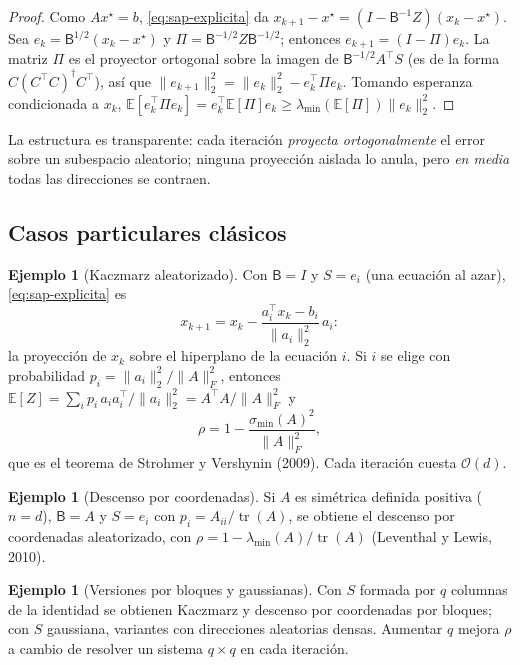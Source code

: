 \documentclass[11pt,a4paper,oneside]{book}
\theoremstyle{definition}
\newtheorem{ejemplo}[teorema]{Ejemplo}
\theoremstyle{remark}
\newcommand{\E}{\mathbb{E}}
\newcommand{\cO}{\mathcal{O}}
\newcommand{\T}{^{\top}}
\newcommand{\nrm}[1]{\lVert #1\rVert}
\DeclareMathOperator{\tr}{tr}
\begin{document}
\begin{proof}
Como $Ax^\star=b$, \eqref{eq:sap-explicita} da $x_{k+1}-x^\star=(I-\mathsf B^{-1}Z)(x_k-x^\star)$. Sea
$e_k=\mathsf B^{1/2}(x_k-x^\star)$ y $\Pi=\mathsf B^{-1/2}Z\mathsf B^{-1/2}$; entonces $e_{k+1}=(I-\Pi)e_k$. La matriz $\Pi$ es
el proyector ortogonal sobre la imagen de $\mathsf B^{-1/2}A\T S$ (es de la forma $C(C\T C)^{\dagger}C\T$), así que
$\nrm{e_{k+1}}_2^2=\nrm{e_k}_2^2-e_k\T\Pi e_k$. Tomando esperanza condicionada a $x_k$,
$\E[e_k\T\Pi e_k]=e_k\T\E[\Pi]e_k\ge\lambda_{\min}(\E[\Pi])\nrm{e_k}_2^2$.
\end{proof}

La estructura es transparente: cada iteración \emph{proyecta ortogonalmente} el error sobre un subespacio
aleatorio; ninguna proyección aislada lo anula, pero \emph{en media} todas las direcciones se contraen.

\subsection{Casos particulares clásicos}

\begin{ejemplo}[Kaczmarz aleatorizado]\label{ej:kaczmarz}
Con $\mathsf B=I$ y $S=e_i$ (una ecuación al azar), \eqref{eq:sap-explicita} es
\[ x_{k+1}=x_k-\frac{a_i\T x_k-b_i}{\nrm{a_i}_2^2}\,a_i : \]
la proyección de $x_k$ sobre el hiperplano de la ecuación $i$. Si $i$ se elige con probabilidad
$p_i=\nrm{a_i}_2^2/\nrm{A}_F^2$, entonces $\E[Z]=\sum_ip_i\,a_ia_i\T/\nrm{a_i}_2^2=A\T A/\nrm{A}_F^2$ y
\[ \rho=1-\frac{\sigma_{\min}(A)^2}{\nrm{A}_F^2}, \]
que es el teorema de Strohmer y Vershynin (2009). Cada iteración cuesta $\cO(d)$.
\end{ejemplo}

\begin{ejemplo}[Descenso por coordenadas]\label{ej:cd}
Si $A$ es simétrica definida positiva ($n=d$), $\mathsf B=A$ y $S=e_i$ con $p_i=A_{ii}/\tr(A)$, se obtiene el descenso
por coordenadas aleatorizado, con $\rho=1-\lambda_{\min}(A)/\tr(A)$ (Leventhal y Lewis, 2010).
\end{ejemplo}

\begin{ejemplo}[Versiones por bloques y gaussianas]
Con $S$ formada por $q$ columnas de la identidad se obtienen Kaczmarz y descenso por coordenadas por bloques;
con $S$ gaussiana, variantes con direcciones aleatorias densas. Aumentar $q$ mejora $\rho$ a cambio de resolver
un sistema $q\times q$ en cada iteración.
\end{ejemplo}
\end{document}
